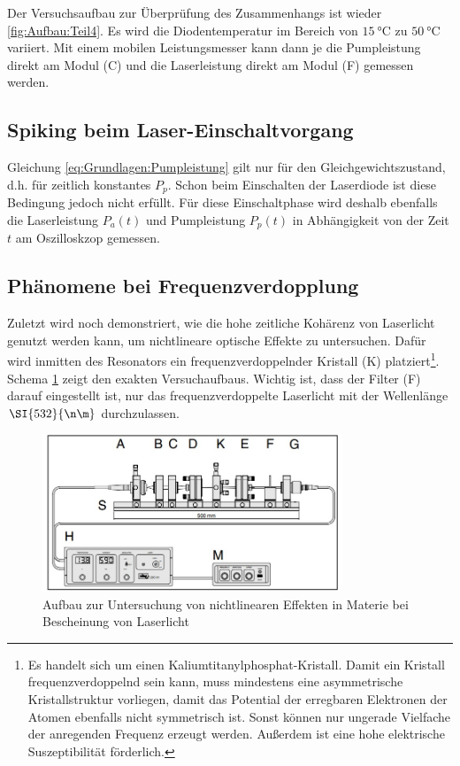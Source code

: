 \documentclass[../main.tex]{subfiles}
\begin{document}
        Der Versuchsaufbau zur Überprüfung des Zusammenhangs ist wieder \ref{fig:Aufbau:Teil4}. Es wird die Diodentemperatur im Bereich von $\SI{15}{\celsius}$ zu $\SI{50}{\celsius}$ variiert. Mit einem mobilen Leistungsmesser kann dann je die Pumpleistung direkt am Modul (C) und die Laserleistung direkt am Modul (F) gemessen werden.

    \subsection{Spiking beim Laser-Einschaltvorgang}
        Gleichung \ref{eq:Grundlagen:Pumpleistung} gilt nur für den Gleichgewichtszustand, d.h. für zeitlich konstantes $P_p$. Schon beim Einschalten der Laserdiode ist diese Bedingung jedoch nicht erfüllt. Für diese Einschaltphase wird deshalb ebenfalls die Laserleistung $P_a(t)$ und Pumpleistung $P_p(t)$ in Abhängigkeit von der Zeit $t$ am Oszilloskzop gemessen. 

    \subsection{Phänomene bei Frequenzverdopplung}
        Zuletzt wird noch demonstriert, wie die hohe zeitliche Kohärenz von Laserlicht genutzt werden kann, um nichtlineare optische Effekte zu untersuchen. Dafür wird inmitten des Resonators ein frequenzverdoppelnder Kristall (K) platziert\footnote{Es handelt sich um einen Kaliumtitanylphosphat-Kristall. Damit ein Kristall frequenzverdoppelnd sein kann, muss mindestens eine asymmetrische Kristallstruktur vorliegen,  damit das Potential der erregbaren Elektronen der Atomen ebenfalls nicht symmetrisch ist. Sonst können nur ungerade Vielfache der anregenden Frequenz erzeugt werden. Außerdem ist eine hohe elektrische Suszeptibilität förderlich.}. Schema \ref{fig:Aufbau:Teil7} zeigt den exakten Versuchaufbaus. Wichtig ist, dass der Filter (F) darauf eingestellt ist, nur das frequenzverdoppelte Laserlicht mit der Wellenlänge $\SI{532}{\n\m}$ durchzulassen. 

        \begin{figure}[H]
            \centering
            \includegraphics[width=0.8\textwidth]{Bilddateien/Versuchsaufbau/Teil7.jpg}
            \caption{Aufbau zur Untersuchung von nichtlinearen Effekten in Materie bei Bescheinung von Laserlicht}
            \label{fig:Aufbau:Teil7}
        \end{figure}    
\end{document}
